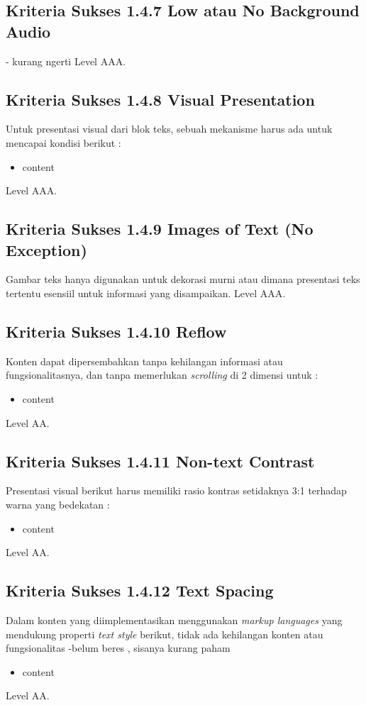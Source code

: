 \subsection{Kriteria Sukses 1.4.7 Low atau No Background Audio}
\label{sec:kriteria_1.4.7}
- kurang ngerti
Level AAA.

\subsection{Kriteria Sukses 1.4.8 Visual Presentation}
\label{sec:kriteria_1.4.8}
Untuk presentasi visual dari blok teks, sebuah mekanisme harus ada untuk mencapai kondisi berikut :
\begin{itemize}
	\item content	
\end{itemize}
Level AAA.

\subsection{Kriteria Sukses 1.4.9 Images of Text (No Exception)}
\label{sec:kriteria_1.4.9}
Gambar teks hanya digunakan untuk dekorasi murni atau dimana presentasi teks tertentu esensiil untuk informasi yang disampaikan. 
Level AAA.

\subsection{Kriteria Sukses 1.4.10 Reflow}
\label{sec:kriteria_1.4.10}
Konten dapat dipersembahkan tanpa kehilangan informasi atau fungsionalitasnya, dan tanpa memerlukan \textit{scrolling} di 2 dimensi untuk :
\begin{itemize}
	\item content
\end{itemize}
Level AA.

\subsection{Kriteria Sukses 1.4.11 Non-text Contrast}
\label{sec:kriteria_1.4.11}
Presentasi visual berikut harus memiliki rasio kontras setidaknya 3:1 terhadap warna yang bedekatan :
\begin{itemize}
	\item content
\end{itemize}
Level AA.

\subsection{Kriteria Sukses 1.4.12 Text Spacing}
\label{sec:kriteria_1.4.12}
Dalam konten yang diimplementasikan menggunakan \textit{markup languages} yang mendukung properti \textit{text style} berikut, tidak ada kehilangan konten atau fungsionalitas 
-belum beres , sisanya kurang paham
\begin{itemize}
	\item content
\end{itemize}
Level AA.

